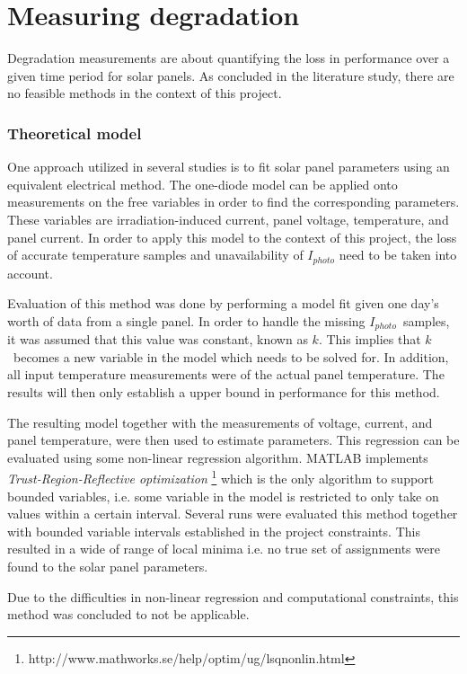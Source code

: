 \section{Measuring degradation}
Degradation measurements are about quantifying the loss in performance over a given time period for solar panels.
As concluded in the literature study, there are no feasible methods in the context of this project.

\subsubsection{Theoretical model}
One approach utilized in several studies is to fit solar panel parameters using an equivalent electrical method.
The one-diode model can be applied onto measurements on the free variables in order to find the corresponding parameters.
These variables are irradiation-induced current, panel voltage, temperature, and panel current.
In order to apply this model to the context of this project, the loss of accurate temperature samples and unavailability of
$I_{photo}$ need to be taken into account.

Evaluation of this method was done by performing a model fit given one day's worth of data from a single panel.
In order to handle the missing $I_{photo}$ samples, it was assumed that this value was constant, known as $k$.
This implies that $k$ becomes a new variable in the model which needs to be solved for.
In addition, all input temperature measurements were of the actual panel temperature.
The results will then only establish a upper bound in performance for this method.

The resulting model together with the measurements of voltage, current, and panel temperature, were then used to estimate parameters.
This regression can be evaluated using some non-linear regression algorithm.
MATLAB implements \emph{Trust-Region-Reflective optimization} \footnote{http://www.mathworks.se/help/optim/ug/lsqnonlin.html} which is the only algorithm to support bounded variables, i.e. some variable in the model is restricted to only take on values within a certain interval.
Several runs were evaluated this method together with bounded variable intervals established in the project constraints.
This resulted in a wide of range of local minima i.e. no true set of assignments were found to the solar panel parameters.

Due to the difficulties in non-linear regression and computational constraints, this method was concluded to not be applicable.

